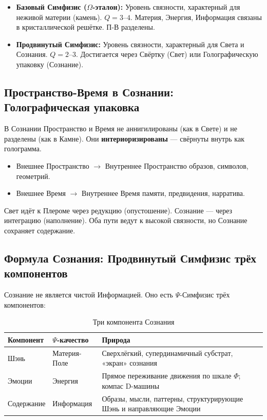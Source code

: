 \documentclass[a4paper,12pt]{article}
\begin{document}
\begin{itemize}
	\item \textbf{Базовый Симфизис ($\Omega$-эталон):} Уровень связности, характерный для неживой материи (камень). $Q = 3\text{--}4$. Материя, Энергия, Информация связаны в кристаллической решётке. П-В разделены.
	\item \textbf{Продвинутый Симфизис:} Уровень связности, характерный для Света и Сознания. $Q = 2\text{--}3$. Достигается через Свёртку (Свет) или Голографическую упаковку (Сознание).
\end{itemize}

\subsection{Пространство-Время в Сознании: Голографическая упаковка}

В Сознании Пространство и Время не аннигилированы (как в Свете) и не разделены (как в Камне). Они \textbf{интериоризированы} — свёрнуты внутрь как голограмма.

\begin{itemize}
	\item Внешнее Пространство $\to$ Внутреннее Пространство образов, символов, геометрий.
	\item Внешнее Время $\to$ Внутреннее Время памяти, предвидения, нарратива.
\end{itemize}

Свет идёт к Плероме через редукцию (опустошение). Сознание — через интеграцию (наполнение). Оба пути ведут к высокой связности, но Сознание сохраняет содержание.

\subsection{Формула Сознания: Продвинутый Симфизис трёх компонентов}

Сознание не является чистой Информацией. Оно есть $\Psi$-Симфизис трёх компонентов:

\begin{table}[H]
	\centering
	\begin{tabular}{|p{3cm}|p{3cm}|p{10cm}|}
		\hline
		\textbf{Компонент} & \textbf{$\Psi$-качество} & \textbf{Природа} \\
		\hline
		Шэнь & Материя-Поле & Сверхлёгкий, супердинамичный субстрат, «экран» сознания \\
		\hline
		Эмоции & Энергия & Прямое переживание движения по шкале $\Phi$; компас D-машины \\
		\hline
		Содержание & Информация & Образы, мысли, паттерны, структурирующие Шэнь и направляющие Эмоции \\
		\hline
	\end{tabular}
	\caption{Три компонента Сознания}
\end{table}
\end{document}
